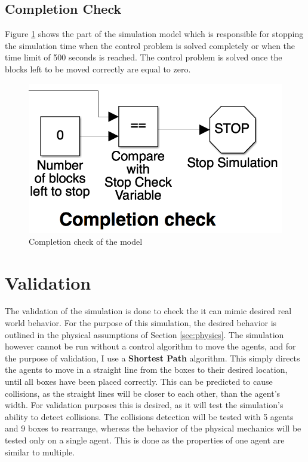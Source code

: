 \subsection{Completion Check}
Figure \ref{fig:completion_check} shows the part of the simulation model which is responsible for stopping the simulation time when the control problem is solved completely or when the time limit of 500 seconds is reached. The control problem is solved once the blocks left to be moved correctly are equal to zero. 

\begin{figure}[H]
  \centering
  \includegraphics[width=.6\columnwidth]{figures/completion_check}
  \caption{\label{fig:completion_check}Completion check of the model}
\end{figure}

\section{Validation}
\label{sec:validation}

The validation of the simulation is done to check the it can mimic desired real world behavior. For the purpose of this simulation, the desired behavior is outlined in the physical assumptions of Section \ref{sec:physics}. The simulation however cannot be run without a control algorithm to move the agents, and for the purpose of validation, I use a \textbf{Shortest Path} algorithm. This simply directs the agents to move in a straight line from the boxes to their desired location, until all boxes have been placed correctly. This can be predicted to cause collisions, as the straight lines will be closer to each other, than the agent's width. For validation purposes this is desired, as it will test the simulation's ability to detect collisions. The collisions detection will be tested with 5 agents and 9 boxes to rearrange, whereas the behavior of the physical mechanics will be tested only on a single agent. This is done as the properties of one agent are similar to multiple.  


